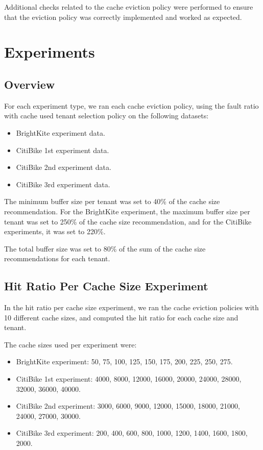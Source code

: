 Additional checks related to the cache eviction policy were performed to ensure that the 
eviction policy was correctly implemented and worked as expected.

\section{Experiments}

\subsection{Overview}

For each experiment type, we ran each cache eviction policy, using the fault ratio with 
cache used tenant selection policy on the following datasets:

\begin{itemize}
    \item BrightKite experiment data.
    \item CitiBike 1st experiment data.
    \item CitiBike 2nd experiment data.
    \item CitiBike 3rd experiment data.
\end{itemize}

The minimum buffer size per tenant was set to 40\% of the cache size recommendation. For the 
BrightKite experiment, the maximum buffer size per tenant was set to 250\% of the cache size 
recommendation, and for the CitiBike experiments, it was set to 220\%.

The total buffer size was set to 80\% of the sum of the cache size recommendations for each 
tenant.

\subsection{Hit Ratio Per Cache Size Experiment}

In the hit ratio per cache size experiment, we ran the cache eviction policies with 10 different
cache sizes, and computed the hit ratio for each cache size and tenant.

The cache sizes used per experiment were:

\begin{itemize}
    \item BrightKite experiment: 50, 75, 100, 125, 150, 175, 200, 225, 250, 275.
    \item CitiBike 1st experiment: 4000, 8000, 12000, 16000, 20000, 24000, 28000, 32000, 36000, 40000.
    \item CitiBike 2nd experiment: 3000, 6000, 9000, 12000, 15000, 18000, 21000, 24000, 27000, 30000.
    \item CitiBike 3rd experiment: 200, 400, 600, 800, 1000, 1200, 1400, 1600, 1800, 2000.
\end{itemize}

